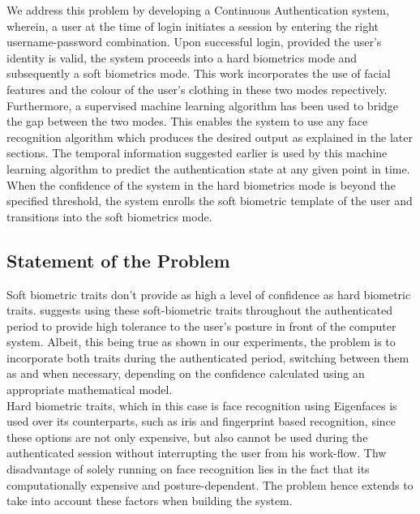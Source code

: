 \documentclass[12pt]{article}			%
\begin{document}
We address this problem by developing a Continuous Authentication system, wherein, a user at the time of login initiates a session by entering the right username-password combination.
Upon successful login, provided the user's identity is valid, the system proceeds into a hard biometrics mode and subsequently a soft biometrics mode.
This work incorporates the use of facial features and the colour of the user's clothing in these two modes repectively. 
Furthermore, a supervised machine learning algorithm has been used to bridge the gap between the two modes.
This enables the system to use any face recognition algorithm which produces the desired output as explained in the later sections.
The temporal information suggested earlier is used by this machine learning algorithm to predict the authentication state at any given point in time.
When the confidence of the system in the hard biometrics mode is beyond the specified threshold, the system enrolls the soft biometric template of the user and transitions into the soft biometrics mode.

\subsection{ Statement of the Problem }
Soft biometric traits don't provide as high a level of confidence as hard biometric traits. \cite{Niin10} suggests using these soft-biometric traits throughout the authenticated period to provide high tolerance to the user's posture in front of the computer system. Albeit, this being true as shown in our experiments, the problem is to incorporate both traits during the authenticated period, switching between them as and when necessary, depending on the confidence calculated using an appropriate mathematical model. \\
Hard biometric traits, which in this case is face recognition using Eigenfaces\cite{Turk91} is used over its counterparts, such as iris and fingerprint based recognition, since these options are not only expensive, but also cannot be used during the authenticated session without interrupting the user from his work-flow. 
Thw disadvantage of solely running on face recognition lies in the fact that its computationally expensive and posture-dependent. The problem hence extends to take into account these factors when building the system.
\end{document}
